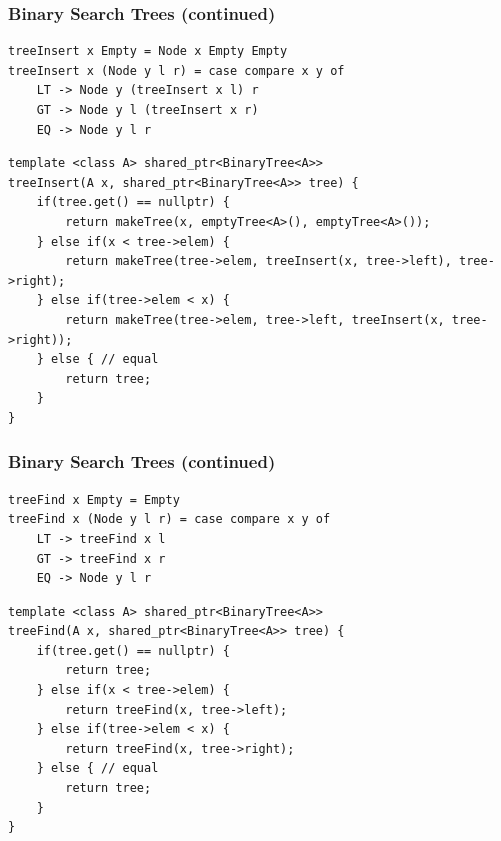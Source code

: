 \documentclass{beamer}
\begin{document}
\begin{frame}[fragile]
\frametitle{Binary Search Trees (continued)}
\begin{Verbatim}[frame=single, fontsize=\scriptsize]
treeInsert x Empty = Node x Empty Empty
treeInsert x (Node y l r) = case compare x y of
    LT -> Node y (treeInsert x l) r
    GT -> Node y l (treeInsert x r)
    EQ -> Node y l r
\end{Verbatim}

\begin{Verbatim}[frame=single, fontsize=\scriptsize]
template <class A> shared_ptr<BinaryTree<A>>
treeInsert(A x, shared_ptr<BinaryTree<A>> tree) {
    if(tree.get() == nullptr) {
        return makeTree(x, emptyTree<A>(), emptyTree<A>());
    } else if(x < tree->elem) {
        return makeTree(tree->elem, treeInsert(x, tree->left), tree->right);
    } else if(tree->elem < x) {
        return makeTree(tree->elem, tree->left, treeInsert(x, tree->right));
    } else { // equal
        return tree;
    }
}
\end{Verbatim}
\end{frame}

\begin{frame}[fragile]
\frametitle{Binary Search Trees (continued)}
\begin{Verbatim}[frame=single, fontsize=\scriptsize]
treeFind x Empty = Empty
treeFind x (Node y l r) = case compare x y of
    LT -> treeFind x l
    GT -> treeFind x r
    EQ -> Node y l r
\end{Verbatim}
\begin{Verbatim}[frame=single, fontsize=\scriptsize]
template <class A> shared_ptr<BinaryTree<A>>
treeFind(A x, shared_ptr<BinaryTree<A>> tree) {
    if(tree.get() == nullptr) {
        return tree;
    } else if(x < tree->elem) {
        return treeFind(x, tree->left);
    } else if(tree->elem < x) {
        return treeFind(x, tree->right);
    } else { // equal
        return tree;
    }
}
\end{Verbatim}
\end{frame}

\end{document}
